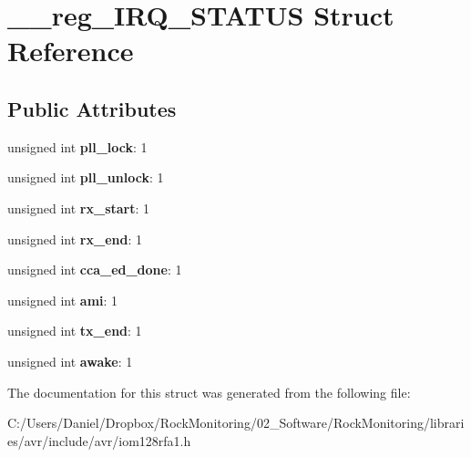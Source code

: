 \hypertarget{struct____reg___i_r_q___s_t_a_t_u_s}{}\section{\+\_\+\+\_\+reg\+\_\+\+I\+R\+Q\+\_\+\+S\+T\+A\+T\+US Struct Reference}
\label{struct____reg___i_r_q___s_t_a_t_u_s}
\subsection*{Public Attributes}
\begin{DoxyCompactItemize}
\item 
unsigned int {\bfseries pll\+\_\+lock}\+: 1\hypertarget{struct____reg___i_r_q___s_t_a_t_u_s_a092a6fe22ef6ad3bebf1d7168aacd675}{}\label{struct____reg___i_r_q___s_t_a_t_u_s_a092a6fe22ef6ad3bebf1d7168aacd675}

\item 
unsigned int {\bfseries pll\+\_\+unlock}\+: 1\hypertarget{struct____reg___i_r_q___s_t_a_t_u_s_a489a0137513cd8d46b879589bb2f21d6}{}\label{struct____reg___i_r_q___s_t_a_t_u_s_a489a0137513cd8d46b879589bb2f21d6}

\item 
unsigned int {\bfseries rx\+\_\+start}\+: 1\hypertarget{struct____reg___i_r_q___s_t_a_t_u_s_ae1ac5b27075d821a339c6791024b0389}{}\label{struct____reg___i_r_q___s_t_a_t_u_s_ae1ac5b27075d821a339c6791024b0389}

\item 
unsigned int {\bfseries rx\+\_\+end}\+: 1\hypertarget{struct____reg___i_r_q___s_t_a_t_u_s_acf1d0b1fbe7e9389afefa31b3447c6d9}{}\label{struct____reg___i_r_q___s_t_a_t_u_s_acf1d0b1fbe7e9389afefa31b3447c6d9}

\item 
unsigned int {\bfseries cca\+\_\+ed\+\_\+done}\+: 1\hypertarget{struct____reg___i_r_q___s_t_a_t_u_s_ae69e965bd7f4da3612d97fb89319d2e3}{}\label{struct____reg___i_r_q___s_t_a_t_u_s_ae69e965bd7f4da3612d97fb89319d2e3}

\item 
unsigned int {\bfseries ami}\+: 1\hypertarget{struct____reg___i_r_q___s_t_a_t_u_s_a7f1e6f9a8d57a6458767a39aaff959b6}{}\label{struct____reg___i_r_q___s_t_a_t_u_s_a7f1e6f9a8d57a6458767a39aaff959b6}

\item 
unsigned int {\bfseries tx\+\_\+end}\+: 1\hypertarget{struct____reg___i_r_q___s_t_a_t_u_s_ac2536e974ddaeefbd7e7a73d689d7dce}{}\label{struct____reg___i_r_q___s_t_a_t_u_s_ac2536e974ddaeefbd7e7a73d689d7dce}

\item 
unsigned int {\bfseries awake}\+: 1\hypertarget{struct____reg___i_r_q___s_t_a_t_u_s_a8496319d022a197bba78d61cdb462266}{}\label{struct____reg___i_r_q___s_t_a_t_u_s_a8496319d022a197bba78d61cdb462266}

\end{DoxyCompactItemize}


The documentation for this struct was generated from the following file\+:\begin{DoxyCompactItemize}
\item 
C\+:/\+Users/\+Daniel/\+Dropbox/\+Rock\+Monitoring/02\+\_\+\+Software/\+Rock\+Monitoring/libraries/avr/include/avr/iom128rfa1.\+h\end{DoxyCompactItemize}
